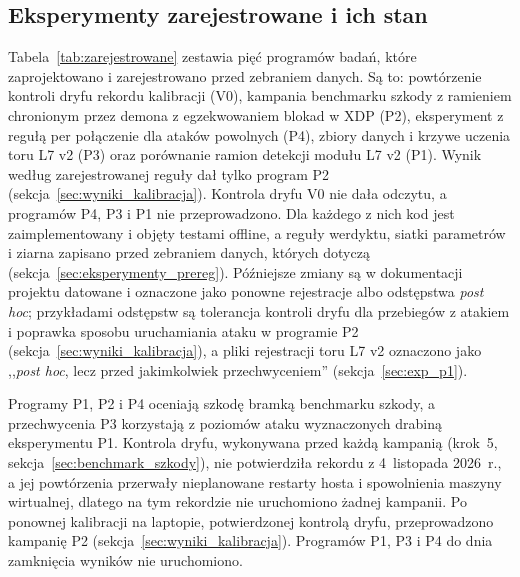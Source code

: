 \documentclass[a4paper,12pt]{article}
\begin{document}
\subsection{Eksperymenty zarejestrowane i ich stan}\label{sec:wyniki_niewykonane}
Tabela~\ref{tab:zarejestrowane} zestawia pięć programów badań, które zaprojektowano i zarejestrowano przed zebraniem danych. Są to: powtórzenie kontroli dryfu rekordu kalibracji (V0), kampania benchmarku szkody z ramieniem chronionym przez demona z egzekwowaniem blokad w XDP (P2), eksperyment z regułą per połączenie dla ataków powolnych (P4), zbiory danych i krzywe uczenia toru L7 v2 (P3) oraz porównanie ramion detekcji modułu L7 v2 (P1). Wynik według zarejestrowanej reguły dał tylko program P2 (sekcja~\ref{sec:wyniki_kalibracja}). Kontrola dryfu V0 nie dała odczytu, a programów P4, P3 i P1 nie przeprowadzono. Dla każdego z nich kod jest zaimplementowany i objęty testami offline, a reguły werdyktu, siatki parametrów i ziarna zapisano przed zebraniem danych, których dotyczą (sekcja~\ref{sec:eksperymenty_prereg}). Późniejsze zmiany są w dokumentacji projektu datowane i oznaczone jako ponowne rejestracje albo odstępstwa \textit{post hoc}; przykładami odstępstw są tolerancja kontroli dryfu dla przebiegów z atakiem i poprawka sposobu uruchamiania ataku w programie P2 (sekcja~\ref{sec:wyniki_kalibracja}), a pliki rejestracji toru L7 v2 oznaczono jako ,,\textit{post hoc}, lecz przed jakimkolwiek przechwyceniem'' (sekcja~\ref{sec:exp_p1}).

Programy P1, P2 i P4 oceniają szkodę bramką benchmarku szkody, a przechwycenia P3 korzystają z poziomów ataku wyznaczonych drabiną eksperymentu P1. Kontrola dryfu, wykonywana przed każdą kampanią (krok~5, sekcja~\ref{sec:benchmark_szkody}), nie potwierdziła rekordu z 4~listopada 2026~r., a jej powtórzenia przerwały nieplanowane restarty hosta i spowolnienia maszyny wirtualnej, dlatego na tym rekordzie nie uruchomiono żadnej kampanii. Po ponownej kalibracji na laptopie, potwierdzonej kontrolą dryfu, przeprowadzono kampanię P2 (sekcja~\ref{sec:wyniki_kalibracja}). Programów P1, P3 i P4 do dnia zamknięcia wyników nie uruchomiono.
\end{document}
